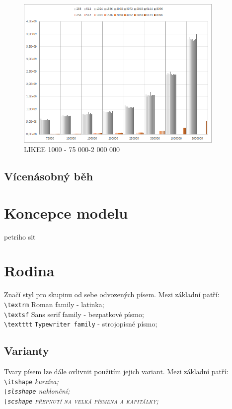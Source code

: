 \documentclass[a4paper, 11pt]{article}
\begin{document}
\begin{figure}[H]
\centering
\includegraphics[width=100mm]{images/f1000-75k-2kk.png}
\caption{LIKEE 1000 - 75 000-2 000 000}
\end{figure}

\subsection{Vícenásobný běh}



\section{Koncepce modelu}
petriho sit



\section{Rodina}
Značí styl pro skupinu od sebe odvozených písem. Mezi základní patří: \\ 
\verb|\textrm| \hspace{0.5cm} \textrm{Roman family} - latinka;\\
\verb|\textsf| \hspace{0.5cm} \textsf{Sans serif family} - bezpatkové písmo;\\
\verb|\textttt| \hspace{0.3cm} \texttt{Typewriter family} - strojopisné písmo;
\cite{latex_kompletni_pruvodce, typograficky_manual}

\subsection{Varianty}
Tvary písem lze dále ovlivnit použitím jejich variant. Mezi základní patří: \\
\verb|\itshape| \hspace{0.5cm} \itshape{kurzíva;} \\
\verb|\slsshape| \hspace{0.28cm} \slshape{naklonění;} \\
\verb|\scshape| \hspace{0.5cm} \scshape přepnutí na velká písmena a kapitálky; \normalfont
\cite{latex_kompletni_pruvodce, typograficky_manual}
\end{document}

